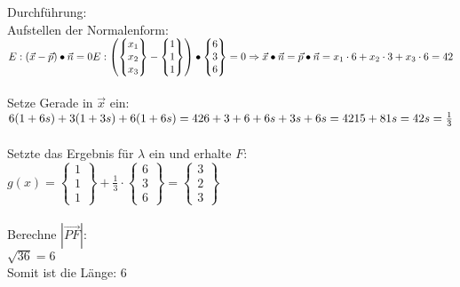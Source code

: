 Durchführung: \\
Aufstellen der Normalenform: \\
$
E: (\vec{x} - \vec{p}) \bullet \vec{n} = 0\\
E: 
\begin{pmatrix}
    \begin{Bmatrix}
        x_1 \\ x_2 \\ x_3
    \end{Bmatrix}
    - 
    \begin{Bmatrix}
        1 \\ 1 \\ 1
    \end{Bmatrix}
\end{pmatrix}
\bullet
\begin{Bmatrix}
    6 \\ 3 \\ 6
\end{Bmatrix}
= 0 \\
\Rightarrow
\vec{x} \bullet \vec{n} = \vec{p} \bullet \vec{n} \\
= x_1\cdot 6 + x_2 \cdot 3 + x_3 \cdot 6 = 42
$
\\
\
\\
Setze Gerade in $\vec{x}$ ein: \\
$
6(1+6s) + 3(1+3s) + 6(1+6s) = 42 \\
6 + 3 + 6 + 6s + 3s + 6s = 42 \\
15 + 81s = 42
s = \frac{1}{3}
$
\\
\
\\ 
Setzte das Ergebnis für $\lambda$ ein und erhalte $F$: \\
$
g(x) = 
\begin{Bmatrix}
    1 \\ 1 \\ 1
\end{Bmatrix}
+ \frac{1}{3} \cdot
\begin{Bmatrix}
    6 \\ 3 \\ 6
\end{Bmatrix}
= 
\begin{Bmatrix}
    3 \\ 2 \\ 3
\end{Bmatrix}
$
\\
\
\\
Berechne $|\overrightarrow{PF}|$: \\
$\sqrt{36} = 6$
\\
Somit ist die Länge: $6$

